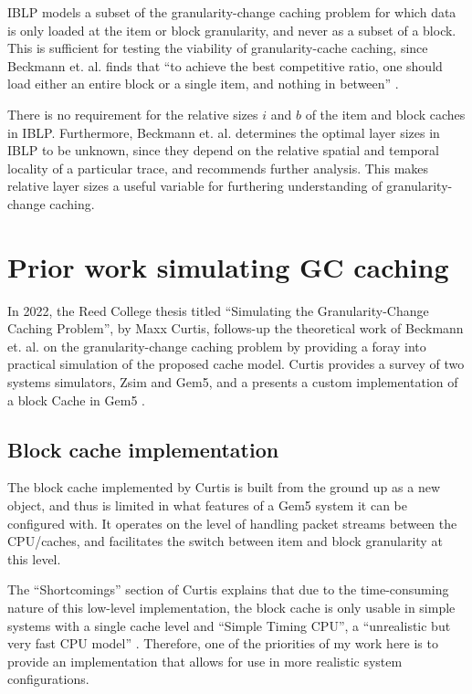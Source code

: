 \documentclass[12pt,twoside]{reedthesis}
\begin{document}
	IBLP models a subset of the granularity-change caching problem for which data is only loaded at the item or block granularity, and never as a subset of a block. This is sufficient for testing the viability of granularity-cache caching, since Beckmann et. al. finds that ``to achieve the best competitive ratio, one should load either an entire block or a single item, and nothing in between'' \cite{beckmann}.
	
	There is no requirement for the relative sizes $i$ and $b$ of the item and block caches in IBLP. Furthermore, Beckmann et. al. determines the optimal layer sizes in IBLP to be unknown, since they depend on the relative spatial and temporal locality of a particular trace, and recommends further analysis. This makes relative layer sizes a useful variable for furthering understanding of granularity-change caching.


\section{Prior work simulating GC caching}

In 2022, the Reed College thesis titled ``Simulating the Granularity-Change Caching Problem'', by Maxx Curtis, follows-up the theoretical work of Beckmann et. al. on the granularity-change caching problem by providing a foray into practical simulation of the proposed cache model. Curtis provides a survey of two systems simulators, Zsim and Gem5, and a presents a custom implementation of a block Cache in Gem5 \cite{curtis}.

	\subsection*{Block cache implementation}

	The block cache implemented by Curtis is built from the ground up as a new object, and thus is limited in what features of a Gem5 system it can be configured with. It operates on the level of handling packet streams between the CPU/caches, and facilitates the switch between item and block granularity at this level. 

	The ``Shortcomings'' section of Curtis explains that due to the time-consuming nature of this low-level implementation, the block cache is only usable in simple systems with a single cache level and ``Simple Timing CPU'', a ``unrealistic but very fast CPU model'' \cite{curtis}. Therefore, one of the priorities of my work here is to provide an implementation that allows for use in more realistic system configurations.
\end{document}
